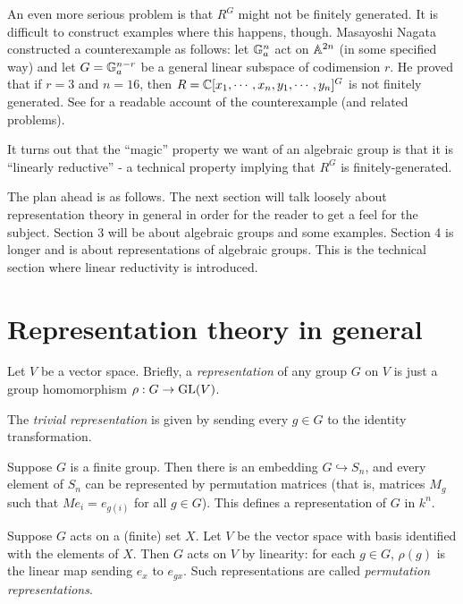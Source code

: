 \documentclass[11pt, english]{article}
\begin{document}
\begin{example}
An even more serious problem is that $R^G$ might not be finitely generated. It is difficult to construct examples where this happens, though. Masayoshi Nagata constructed a counterexample as follows: let $\mathbb{G}_a^n$ act on $\mathbb{A}^{2n}$ (in some specified way) and let $G = \mathbb{G}_a^{n-r}$ be a general linear subspace of codimension $r$. He proved that if $r=3$ and $n=16$, then $R=\mathbb{C}[x_1,\cdots,x_n,y_1,\cdots,y_n]^G$ is not finitely generated. See \cite{mckernan_moridream} for a readable account of the counterexample (and related problems).
\end{example}

It turns out that the ``magic'' property we want of an algebraic group is that it is ``linearly reductive'' - a technical property implying that $R^G$ is finitely-generated.

The plan ahead is as follows. The next section will talk loosely about representation theory in general in order for the reader to get a feel for the subject. Section 3 will be about algebraic groups and some examples. Section 4 is longer and is about representations of algebraic groups. This is the technical section where linear reductivity is introduced. 


\section{Representation theory in general}

Let $V$ be a vector space. Briefly, a \emph{representation} of any group $G$ on $V$ is just a group homomorphism $\rho:G \to \operatorname{GL}(V)$.

\begin{example}
The \emph{trivial representation} is given by sending every $g \in G$ to the identity transformation.
\end{example}

\begin{example}
Suppose $G$ is a finite group. Then there is an embedding $G \hookrightarrow S_n$, and every element of $S_n$ can be represented by permutation matrices (that is, matrices $M_g$ such that $Me_i=e_{g(i)}$ for all $g \in G$). This defines a representation of $G$ in $k^n$. 
\end{example}

\begin{example}
Suppose $G$ acts on a (finite) set $X$. Let $V$ be the vector space with basis identified with the elements of $X$. Then $G$ acts on $V$ by linearity: for each $g \in G$, $\rho(g)$ is the linear map sending $e_x$ to $e_{gx}$. Such representations are called \emph{permutation representations}.
\end{example}
\end{document}
